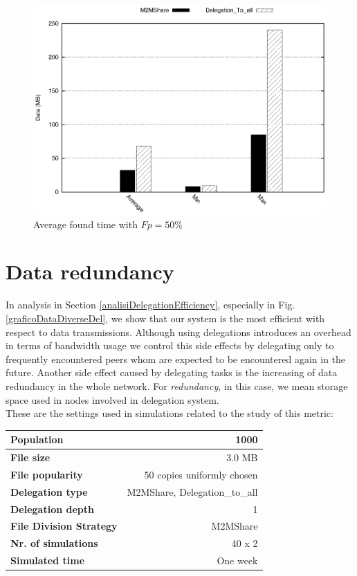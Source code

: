 \begin{figure}[ht]
\begin{center}
\begin{minipage}[b]{0.5\linewidth}
\centering
\includegraphics[scale=0.5]{grafici/data.eps}
\caption{Average found time with $Fp = 50\%$}
\label{graficiTempiVF_Fp50}
\end{minipage}
\end{center}
\end{figure}


\newpage
\section{Data redundancy}
In analysis in Section \ref{analisiDelegationEfficiency}, especially in Fig.  \ref{graficoDataDiverseDel}, we show that our system is the most efficient with respect to data transmissions. Although using delegations introduces an overhead in terms of bandwidth usage we control this side effects by delegating only to frequently encountered peers whom are expected to be encountered again in the future. Another side effect caused by delegating tasks is the increasing of data redundancy in the whole network. For \textit{redundancy}, in this case, we mean storage space used in nodes involved in delegation system. \\ These are the settings used in simulations related to the study of this metric:

\begin{table}[h]
\begin{center}
\begin{tabular}{|l|r|}
\hline
\bfseries Population & 1000 \\
\hline
\bfseries File size & 3.0 MB \\
\hline
\bfseries File popularity & 50 copies uniformly chosen \\
\hline
\bfseries Delegation type & M2MShare, Delegation\_to\_all \\
\hline
\bfseries Delegation depth & 1 \\
\hline
\bfseries File Division Strategy & M2MShare \\
\hline
\bfseries Nr. of simulations & 40 x 2\\
\hline
\bfseries Simulated time & One week \\
\hline
\end{tabular}
\end{center}
\end{table}

